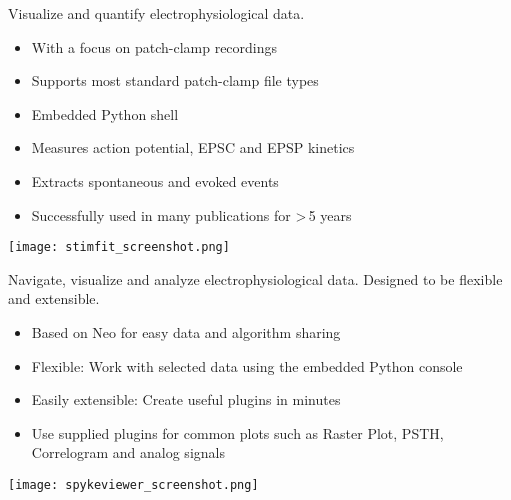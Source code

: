 \begin{multicols}{3}
Visualize and quantify electrophysiological data.
\begin{itemize}[nolistsep,topsep=0em,leftmargin=1pc]
\item With a focus on patch-clamp recordings
\item Supports most standard patch-clamp file types
\item Embedded Python shell
\item Measures action potential, EPSC and EPSP kinetics
\item Extracts spontaneous and evoked events
\item Successfully used in many publications for >\,5 years
\end{itemize}

\vspace{1em}
\texttt{[image: stimfit\_screenshot.png]}




Navigate, visualize and analyze electrophysiological data. Designed to be flexible and extensible.

\begin{itemize}[nolistsep,topsep=0em,leftmargin=1pc]
\item Based on Neo for easy data and algorithm sharing
\item Flexible: Work with selected data using the embedded Python console
\item Easily extensible: Create useful plugins in minutes
\item Use supplied plugins for common plots such as Raster Plot, PSTH, Correlogram and analog signals
\end{itemize}

\texttt{[image: spykeviewer\_screenshot.png]}





\end{multicols}
